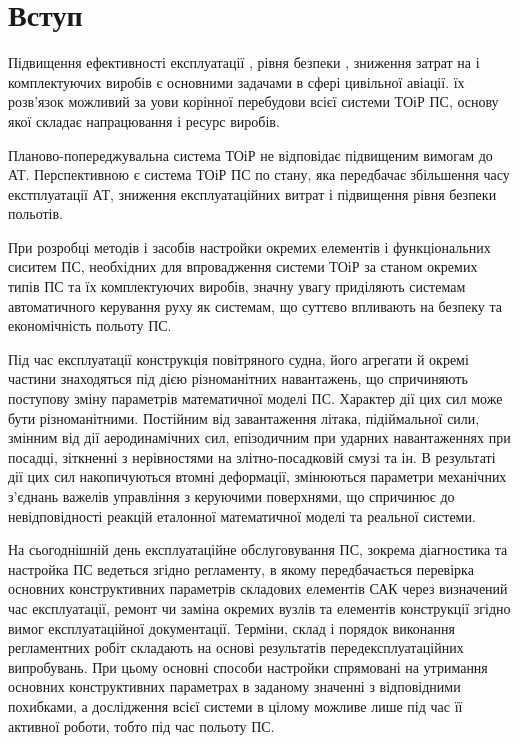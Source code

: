 \section*{Вступ}
Підвищення ефективності експлуатації 
, рівня безпеки 
, зниження затрат на 
 і 
комплектуючих виробів є основними задачами в сфері цивільної 
авіації. їх розв'язок можливий за уови корінної перебудови 
всієї системи ТОіР ПС, основу якої складає напрацювання і 
ресурс виробів.

Планово-попереджувальна система ТОіР не відповідає підвищеним 
вимогам до АТ. Перспективною є система ТОіР ПС по стану, яка 
передбачає збільшення часу екстплуатації АТ, зниження 
експлуатаційних витрат і підвищення рівня безпеки польотів.

При розробці методів і засобів настройки окремих елементів і 
функціональних сиситем ПС, необхідних для впровадження системи 
ТОіР за станом окремих типів ПС та їх комплектуючих виробів, 
значну увагу приділяють системам автоматичного керування руху 
як системам, що суттєво впливають на безпеку та економічність 
польоту ПС.

Під час експлуатації конструкція повітряного судна, його 
агрегати й окремі частини знаходяться під дією різноманітних 
навантажень, що спричиняють поступову зміну параметрів 
математичної моделі ПС.  Характер дії цих сил може бути 
різноманітними. Постійним від завантаження літака, підіймальної 
сили, змінним від дії аеродинамічних сил, епізодичним при 
ударних навантаженнях при посадці, зіткненні з нерівностями на 
злітно-посадковій смузі та ін. В результаті дії цих сил 
накопичуються втомні деформації, змінюються параметри механічних 
з'єднань важелів управління з керуючими поверхнями, що спричинює 
до невідповідності реакцій еталонної математичної моделі та 
реальної системи.

На сьогоднішній день експлуатаційне обслуговування ПС, зокрема 
діагностика та настройка  
ПС ведеться згідно регламенту, в 
якому передбачається перевірка основних конструктивних параметрів 
складових елементів САК через визначений час експлуатації, ремонт 
чи заміна окремих вузлів та елементів конструкції згідно вимог 
експлуатаційної документації. Терміни, склад і порядок виконання 
регламентних робіт складають на основі результатів 
передексплуатаційних випробувань. При цьому основні способи 
настройки спрямовані на утримання основних конструктивних 
параметрах в заданому значенні з відповідними похибками, а 
дослідження всієї системи в цілому можливе лише під час її 
активної роботи, тобто під час польоту ПС.

